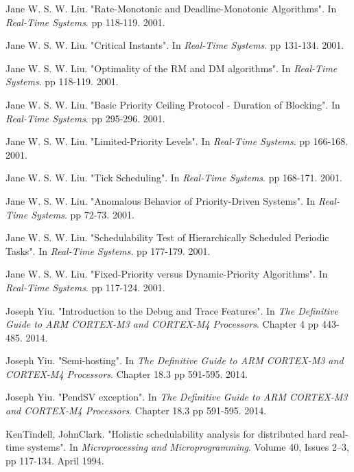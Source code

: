 \documentclass{article}
\begin{document}
\begin{thebibliography}{1}
Jane W. S. W. Liu.
\newblock "Rate-Monotonic and Deadline-Monotonic Algorithms".
\newblock In {\em Real-Time Systems}. pp 118-119. 2001.

Jane W. S. W. Liu.
\newblock "Critical Instants".
\newblock In {\em Real-Time Systems}. pp 131-134. 2001.

Jane W. S. W. Liu.
\newblock "Optimality of the RM and DM algorithms".
\newblock In {\em Real-Time Systems}. pp 118-119. 2001.

Jane W. S. W. Liu.
\newblock "Basic Priority Ceiling Protocol - Duration of Blocking".
\newblock In {\em Real-Time Systems}. pp 295-296. 2001.

Jane W. S. W. Liu.
\newblock "Limited-Priority Levels".
\newblock In {\em Real-Time Systems}. pp 166-168. 2001.

Jane W. S. W. Liu.
\newblock "Tick Scheduling".
\newblock In {\em Real-Time Systems}. pp 168-171. 2001.

Jane W. S. W. Liu.
\newblock "Anomalous Behavior of Priority-Driven Systems".
\newblock In {\em Real-Time Systems}. pp 72-73. 2001.

Jane W. S. W. Liu.
\newblock "Schedulability Test of Hierarchically Scheduled Periodic Tasks".
\newblock In {\em Real-Time Systems}. pp 177-179. 2001.

Jane W. S. W. Liu.
\newblock "Fixed-Priority versus Dynamic-Priority Algorithms".
\newblock In {\em Real-Time Systems}. pp 117-124. 2001.

Joseph Yiu.
\newblock "Introduction to the Debug and Trace Features".
\newblock In {\em The Definitive Guide to ARM CORTEX-M3 and CORTEX-M4 Processors}. Chapter 4 pp 443-485. 2014.

Joseph Yiu.
\newblock "Semi-hosting".
\newblock In {\em The Definitive Guide to ARM CORTEX-M3 and CORTEX-M4 Processors}. Chapter 18.3 pp 591-595. 2014.

Joseph Yiu.
\newblock "PendSV exception".
\newblock In {\em The Definitive Guide to ARM CORTEX-M3 and CORTEX-M4 Processors}. Chapter 18.3 pp 591-595. 2014.

KenTindell, JohnClark.
\newblock "Holistic schedulability analysis for distributed hard real-time systems".
\newblock In {\em Microprocessing and Microprogramming}. Volume 40, Issues 2–3, pp 117-134. April 1994.


\end{thebibliography}
\end{document}
